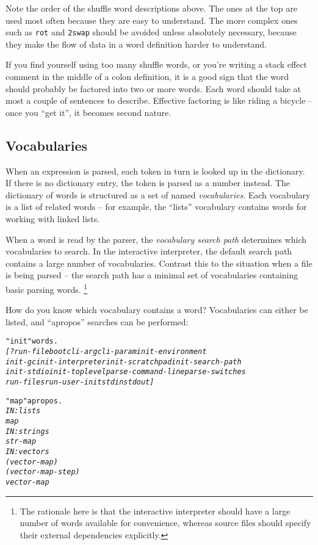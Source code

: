 \documentclass[english]{article}
\begin{document}
Note the order of the shuffle word descriptions above. The ones at
the top are used most often because they are easy to understand. The
more complex ones such as \texttt{rot} and \texttt{2swap} should be avoided unless absolutely necessary, because
they make the flow of data in a word definition harder to understand.

If you find yourself using too many shuffle words, or you're writing
a stack effect comment in the middle of a colon definition, it is
a good sign that the word should probably be factored into two or
more words. Each word should take at most a couple of sentences to describe. Effective factoring is like riding a bicycle -- once you ``get it'', it becomes second nature.


\subsection{Vocabularies}

When an expression is parsed, each token in turn is looked up in the dictionary. If there is no dictionary entry, the token is parsed as a number instead.
The dictionary of words is structured as a set of named \emph{vocabularies}. Each vocabulary is a list
of related words -- for example, the {}``lists''
vocabulary contains words for working with linked lists.

When a word is read by the parser, the \emph{vocabulary search path}
determines which vocabularies to search. In the interactive interpreter,
the default search path contains a large number of vocabularies. Contrast
this to the situation when a file is being parsed -- the search path
has a minimal set of vocabularies containing basic parsing words.%
\footnote{The rationale here is that the interactive interpreter should have
a large number of words available for convenience, whereas
source files should specify their external dependencies explicitly.%
}

How do you know which vocabulary contains a word? Vocabularies can
either be listed, and ``apropos'' searches can be performed:

\begin{alltt}
"init" words.
\emph{{[} ?run-file boot cli-arg cli-param init-environment}
\emph{init-gc init-interpreter init-scratchpad init-search-path}
\emph{init-stdio init-toplevel parse-command-line parse-switches}
\emph{run-files run-user-init stdin stdout {]} }

"map" apropos.
\emph{IN: lists}
\emph{map}
\emph{IN: strings}
\emph{str-map}
\emph{IN: vectors}
\emph{(vector-map)}
\emph{(vector-map-step)}
\emph{vector-map }
\end{alltt}
\end{document}

